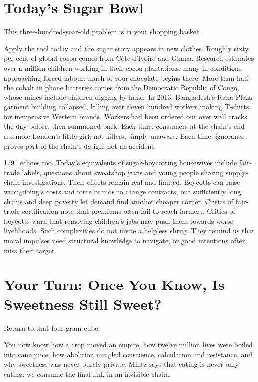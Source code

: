 \section{Today's Sugar Bowl}
This three-hundred-year-old problem is in your shopping basket.

Apply the tool today and the sugar story appears in new clothes. Roughly sixty per cent of global cocoa comes from Côte d'Ivoire and Ghana. Research estimates over a million children working in their cocoa plantations, many in conditions approaching forced labour; much of your chocolate begins there. More than half the cobalt in phone batteries comes from the Democratic Republic of Congo, whose mines include children digging by hand. In 2013, Bangladesh's Rana Plaza garment building collapsed, killing over eleven hundred workers making T-shirts for inexpensive Western brands. Workers had been ordered out over wall cracks the day before, then summoned back. Each time, consumers at the chain's end resemble London's little girl: not killers, simply unaware. Each time, ignorance proves part of the chain's design, not an accident.

1791 echoes too. Today's equivalents of sugar-boycotting housewives include fair-trade labels, questions about sweatshop jeans and young people sharing supply-chain investigations. Their effects remain real and limited. Boycotts can raise wrongdoing's costs and force brands to change contracts, but sufficiently long chains and deep poverty let demand find another cheaper corner. Critics of fair-trade certification note that premiums often fail to reach farmers. Critics of boycotts warn that removing children's jobs may push them towards worse livelihoods. Such complexities do not invite a helpless shrug. They remind us that moral impulses need structural knowledge to navigate, or good intentions often miss their target.

\section[Your Turn: Is Sweetness Still Sweet?]{Your Turn: Once You Know, Is Sweetness Still Sweet?}
Return to that four-gram cube.

You now know how a crop moved an empire, how twelve million lives were boiled into cane juice, how abolition mingled conscience, calculation and resistance, and why sweetness was never purely private. Mintz says that eating is never only eating: we consume the final link in an invisible chain.

